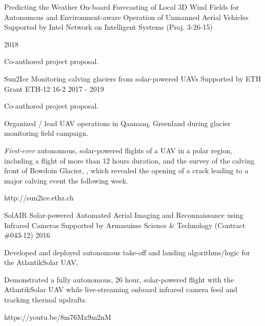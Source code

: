 \begin{cventries}
  \cvprojwideentry
  	{Predicting the Weather} %
  	{On-board Forecasting of Local 3D Wind Fields for Autonomous and
Environment-aware Operation of Unmanned Aerial Vehicles} %
    {Supported by Intel Network on Intelligent Systems (Proj. 3-26-15)} %
    {\parbox{\linewidth}{2018\linebreak}} %
    {
      \begin{cvitems} %
        \item {Co-authored project proposal.}
      \end{cvitems}
    } %
    {} %
    {\showprojectdescriptions}

\vspace{-9pt}

  \cvprojwideentry
  	{Sun2Ice} %
  	{Monitoring calving glaciers from solar-powered UAVs} %
    {Supported by ETH Grant ETH-12 16-2} %
    {2017 - 2019} %
    {
      \begin{cvitems} %
        \item {Co-authored project proposal.}
        \item {Organized / lead UAV operations in Qaanaaq, Greenland during glacier monitoring field campaign.}
        \item {\emph{First-ever} autonomous, solar-powered flights of a UAV in a polar region, including a flight of more than 12 hours duration, and the survey of the calving front of Bowdoin Glacier, , which revealed the opening of a crack leading to a major calving event the following week.}
      \end{cvitems}
    } %
    {http://sun2ice.ethz.ch} %
    {\showprojectdescriptions}
    
\cvprojwideentry
  	{SolAIR} %
  	{Solar-powered Automated Aerial Imaging and Reconnaissance using Infrared Cameras} %
    {Supported by Armasuisse Science \& Technology (Contract \#043-12)} %
    {2016} %
    {
      \begin{cvitems} %
        \item {Developed and deployed autonomous take-off and landing algorithms/logic for the AtlantikSolar UAV.}
        \item {Demonstrated a fully autonomous, 26 hour, solar-powered flight with the AtlantikSolar UAV while live-streaming onboard infrared camera feed and tracking thermal updrafts.}
      \end{cvitems}
    } %
    {https://youtu.be/8m76Mx9m2nM} %
    {\showprojectdescriptions}
    

\end{cventries}
